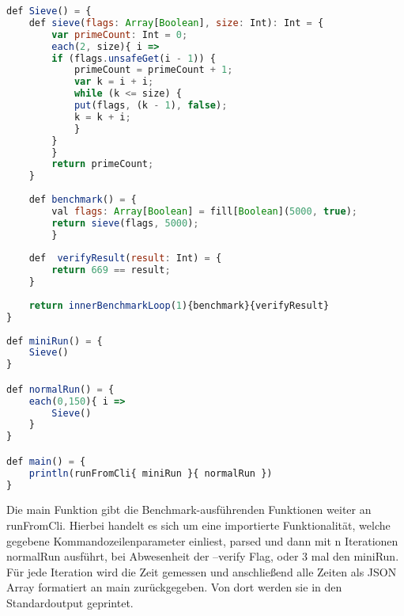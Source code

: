 \begin{lstlisting}[language=JavaScript]
def Sieve() = {
    def sieve(flags: Array[Boolean], size: Int): Int = {
        var primeCount: Int = 0;
        each(2, size){ i =>
        if (flags.unsafeGet(i - 1)) {
            primeCount = primeCount + 1;
            var k = i + i;
            while (k <= size) {
            put(flags, (k - 1), false);
            k = k + i;
            }
        }
        }
        return primeCount;
    }
    
    def benchmark() = {
        val flags: Array[Boolean] = fill[Boolean](5000, true);
        return sieve(flags, 5000);
        }
    
    def  verifyResult(result: Int) = {
        return 669 == result;
    }
    
    return innerBenchmarkLoop(1){benchmark}{verifyResult}   
}
    
def miniRun() = {
    Sieve()
}

def normalRun() = {
    each(0,150){ i =>
        Sieve()
    }
}

def main() = {
    println(runFromCli{ miniRun }{ normalRun })
}
\end{lstlisting}
Die main Funktion gibt die Benchmark-ausführenden Funktionen weiter an runFromCli. Hierbei handelt es sich um eine importierte Funktionalität, welche gegebene Kommandozeilenparameter einliest, parsed und dann mit n Iterationen normalRun ausführt, bei Abwesenheit der --verify Flag, oder 3 mal den miniRun.
Für jede Iteration wird die Zeit gemessen und anschließend alle Zeiten als JSON Array formatiert an main zurückgegeben. Von dort werden sie in den Standardoutput geprintet.
